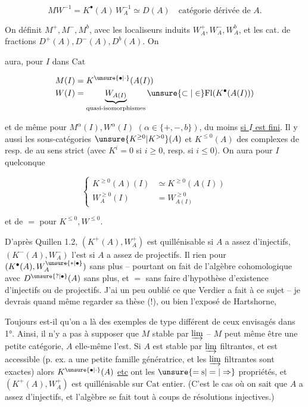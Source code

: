 \[ MW^{-1}=K^\bullet(A)\,W_A^{-1}\simeq D(A)\quad\text{catégorie dérivée de }A. \]

On définit  $M^+,M^-,M^b$, avec les localiseurs induits $W_A^+,W_A^-,W_A^b$, et les cat. de fractions $D^+(A),D^-(A),D^b(A)$. On

aura, pour $I$ dans $\mathrm{Cat}$

\[ \begin{aligned}
M(I)&=K^{\unsure{\bullet|\cdot}}(A(I))\\
W(I)&=\underbrace{W_{A(I)}}_{\text{quasi-isomorphismes}}\unsure{\subset|\in}\mathrm{Fl}(K^\bullet(A(I)))
\end{aligned} \]

et de même pour $M^\alpha(I),W^\alpha(I)$ $(\alpha\in\{+,-,b\})$, du moins \uline{si $I$ est fini}. Il y aussi les sous-catégories $\unsure{K^{\geq0}|K^{>0}}(A)$ et $K^{\leq0}(A)$ des complexes de  resp. de  au sens strict (avec $K^i=0$ si $i\geq0$, resp. si $i\leq0$). On aura pour $I$ quelconque

\[ \left\{\begin{aligned}
K^{\geq0}(A)(I)&\simeq K^{\geq0}(A(I))\\
W_A^{\geq0}(I)&=W_{A(I)}^{\geq0}
\end{aligned}\right. \]

et de $=$ pour $K^{\leq0},W^{\leq0}$.

D'après Quillen  1.2, $(K^+(A),W_A^+)$ est quillénisable si $A$ a assez d'injectifs, $(K^-(A),W_A^-)$ l'est si $A$ a assez de projectifs. Il  rien pour $(K^\bullet(A),W_A^{\unsure{*|\bullet}})$ sans plus -- pourtant on fait de l'algèbre cohomologique avec  $D^{\unsure{?|\bullet}}(A)$ sans plus, et $=$ sans faire d'hypothèse d'existence d'injectifs ou de projectifs. J'ai un peu oublié ce que Verdier a fait à ce sujet -- je devrais quand même regarder sa thèse (!), ou bien l'exposé de Hartshorne,

Toujours est-il qu'on a là des exemples de type  différent de ceux envisagés dans 1°. Ainsi, il n'y a pas à supposer que $M$  stable par  $\varinjlim$ -- $M$ peut même être une petite catégorie,   $A$ elle-même l'est. Si $A$ est stable par  $\varinjlim$ filtrantes, et est accessible (p. ex. a une petite famille génératrice, et les $\varinjlim$ filtrantes sont exactes) alors $K^{\unsure{\bullet|\cdot}}(A)$ \uline{etc} ont les $\unsure{=\mathrm{s}|=|\Rightarrow}$ propriétés, et $(K^+(A),W_A^+)$ est quillénisable sur $\mathrm{Cat}$  entier. (C'est le cas où on sait que $A$ a assez d'injectifs, et l'algèbre  se fait tout à coups de résolutions injectives.)

